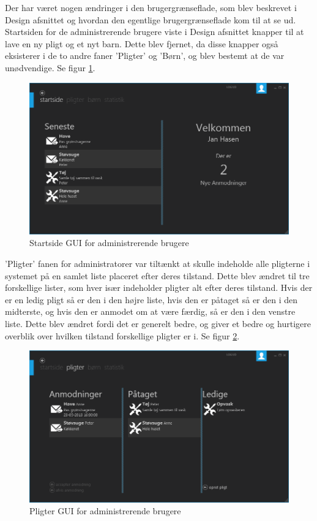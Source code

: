 Der har været nogen ændringer i den brugergrænseflade, som blev beskrevet i Design afsnittet og hvordan den egentlige brugergrænseflade kom til at se ud. Startsiden for de administrerende brugere viste i Design afsnittet knapper til at lave en ny pligt og et nyt barn. Dette blev fjernet, da disse knapper også eksisterer i de to andre faner ’Pligter’ og ’Børn’, og blev bestemt at de var unødvendige. Se figur \ref{AdminHome}.

\begin{figure}[H]
\centering
\includegraphics[width=1\textwidth]{Billeder/AdminHomeGUI.png}
\caption{Startside GUI for administrerende brugere}
\label{AdminHome}
\end{figure}

’Pligter’ fanen for administratorer var tiltænkt at skulle indeholde alle pligterne i systemet på en samlet liste placeret efter deres tilstand. Dette blev ændret til tre forskellige lister, som hver især indeholder pligter alt efter deres tilstand. Hvis der er en ledig pligt så er den i den højre liste, hvis den er påtaget så er den i den midterste, og hvis den er anmodet om at være færdig, så er den i den venstre liste. Dette blev ændret fordi det er generelt bedre, og giver et bedre og hurtigere overblik over hvilken tilstand forskellige pligter er i. Se figur \ref{AdminChore}.

\begin{figure}[H]
\centering
\includegraphics[width=1\textwidth]{Billeder/AdminChoreGUI.png}
\caption{Pligter GUI for administrerende brugere}
\label{AdminChore}
\end{figure}

